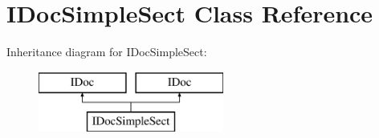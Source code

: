 \hypertarget{class_i_doc_simple_sect}{}\section{I\+Doc\+Simple\+Sect Class Reference}
\label{class_i_doc_simple_sect}
Inheritance diagram for I\+Doc\+Simple\+Sect\+:\begin{figure}[H]
\begin{center}
\leavevmode
\includegraphics[height=2.000000cm]{class_i_doc_simple_sect}
\end{center}
\end{figure}
